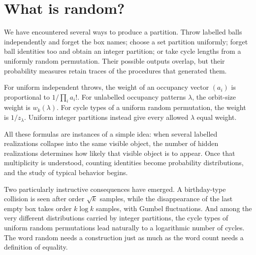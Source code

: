 \section{What is random?}

We have encountered several ways to produce a partition. Throw labelled balls independently and forget the box names; choose a set partition uniformly; forget ball identities too and obtain an integer partition; or take cycle lengths from a uniformly random permutation. Their possible outputs overlap, but their probability measures retain traces of the procedures that generated them.

For uniform independent throws, the weight of an occupancy vector \((a_i)\) is proportional to \(1/\prod_i a_i!\). For unlabelled occupancy patterns \(\lambda\), the orbit-size weight is \(w_k(\lambda)\). For cycle types of a uniform random permutation, the weight is \(1/z_\lambda\). Uniform integer partitions instead give every allowed \(\lambda\) equal weight.

All these formulas are instances of a simple idea: when several labelled realizations collapse into the same visible object, the number of hidden realizations determines how likely that visible object is to appear. Once that multiplicity is understood, counting identities become probability distributions, and the study of typical behavior begins.

Two particularly instructive consequences have emerged. A birthday-type collision is seen after order \(\sqrt{k}\) samples, while the disappearance of the last empty box takes order \(k\log k\) samples, with Gumbel fluctuations. And among the very different distributions carried by integer partitions, the cycle types of uniform random permutations lead naturally to a logarithmic number of cycles. The word random needs a construction just as much as the word count needs a definition of equality.
